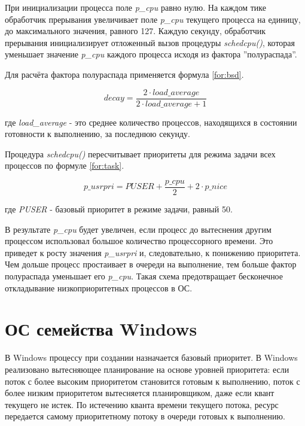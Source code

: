 При инициализации процесса поле \textit{p\_cpu} равно нулю. На каждом тике обработчик прерывания увеличивает поле \textit{p\_cpu} текущего процесса на единицу, до максимального значения, равного 127. Каждую секунду, обработчик прерывания инициализирует отложенный вызов процедуры \textit{schedcpu()}, которая уменьшает значение \textit{p\_cpu} каждого процесса исходя из фактора ''полураспада''.

Для расчёта фактора полураспада применяется формула
\eqref{for:bsd}.

\begin{equation}
    \label{for:bsd}
    decay = \frac{2 \cdot load\_average}{2 \cdot load\_average + 1}
\end{equation}

где \textit{load\_average} - это среднее количество процессов, находящихся в состоянии готовности к выполнению, за последнюю секунду.

Процедура \textit{schedcpu()} пересчитывает приоритеты для режима задачи всех процессов по формуле \eqref{for:task}.

\begin{equation}
    \label{for:task}
    p\_usrpri = PUSER + \frac{p\_cpu}{2} + 2 \cdot p\_nice
\end{equation}

где \textit{PUSER} - базовый приоритет в режиме задачи, равный 50.

В результате \textit{p\_cpu} будет увеличен, если процесс до вытеснения другим процессом использовал большое количество процессорного времени. Это приведет к росту значения \textit{p\_usrpri} и, следовательно, к понижению приоритета. Чем дольше процесс простаивает в очереди на выполнение, тем больше фактор
полураспада уменьшает его \textit{p\_cpu}. Такая схема предотвращает бесконечное откладывание низкоприоритетных процессов в ОС.


\section{ОС семейства Windows}

В Windows процессу при создании назначается базовый приоритет. В Windows реализовано вытесняющее планирование на основе уровней приоритета: если поток с более высоким приоритетом становится готовым к выполнению, поток с более низким приоритетом вытесняется планировщиком, даже если квант текущего не истек. По истечению кванта времени текущего потока, ресурс передается самому приоритетному потоку в очереди готовых к выполнению.

